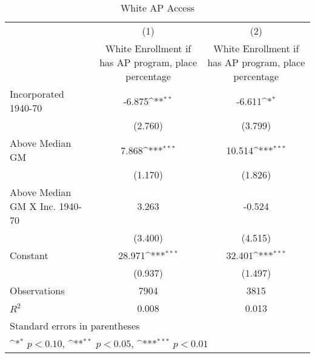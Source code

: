 \begin{table}[htbp]\centering
\def\sym#1{\ifmmode^{#1}\else\(^{#1}\)\fi}
\caption{White AP Access}
\begin{tabular}{l*{2}{c}}
\hline\hline
                    &\multicolumn{1}{c}{(1)}&\multicolumn{1}{c}{(2)}\\
                    &\multicolumn{1}{c}{White Enrollment if has AP program, place percentage}&\multicolumn{1}{c}{White Enrollment if has AP program, place percentage}\\
\hline
Incorporated 1940-70&      -6.875\sym{**} &      -6.611\sym{*}  \\
                    &     (2.760)         &     (3.799)         \\
[1em]
Above Median GM     &       7.868\sym{***}&      10.514\sym{***}\\
                    &     (1.170)         &     (1.826)         \\
[1em]
Above Median GM X Inc. 1940-70&       3.263         &      -0.524         \\
                    &     (3.400)         &     (4.515)         \\
[1em]
Constant            &      28.971\sym{***}&      32.401\sym{***}\\
                    &     (0.937)         &     (1.497)         \\
\hline
Observations        &        7904         &        3815         \\
\(R^{2}\)           &       0.008         &       0.013         \\
\hline\hline
\multicolumn{3}{l}{\footnotesize Standard errors in parentheses}\\
\multicolumn{3}{l}{\footnotesize \sym{*} \(p<0.10\), \sym{**} \(p<0.05\), \sym{***} \(p<0.01\)}\\
\end{tabular}
\end{table}
